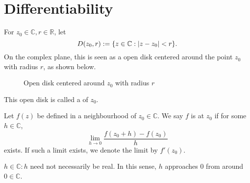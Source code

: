\documentclass[notoc,notitlepage]{tufte-book}
\begin{document}

\section{Differentiability} %
\label{sec:differentiability}

\begin{defn}[Neighbourhood]\label{defn:Neighbourhood}
	For $z_0 \in \mathbb{C}, r \in \mathbb{R}$, let
	\begin{equation}\label{eq:neighbourhood_set}
		D(z_0, r) := \{ z \in \mathbb{C} : \left|z - z_0\right| < r \}.
	\end{equation}
	On the complex plane, this is seen as a open disk centered around the point $z_0$ with radius $r$, as shown below.
	\begin{figure}
		\begin{center}
		\end{center}
		\caption[loftitle]{Open disk centered around $z_0$ with radius $r$}
		\label{figure:neighbourhood_open_disk}
	\end{figure}
	This open disk is called a  of $z_0$.
\end{defn}

\begin{defn}\label{defn:Differentiable/Holomorphic}
	Let $f(z)$ be defined in a neighbourhood of $z_0 \in \mathbb{C}$. We say $f$ is  at $z_0$ if for some $h \in \mathbb{C}$,
	\begin{equation}\label{eq:holomorphic}
		\lim_{h \to 0} \frac{f(z_0 + h) - f(z_0)}{h} 
	\end{equation}
	exists. If such a limit exists, we denote the limit by $f'(z_0)$.
\end{defn}

\begin{remark}
	$h \in \mathbb{C}: h$ need not necessarily be real. In this sense, $h$ approaches $0$ from  around $0 \in \mathbb{C}$.
\end{remark}
\end{document}
